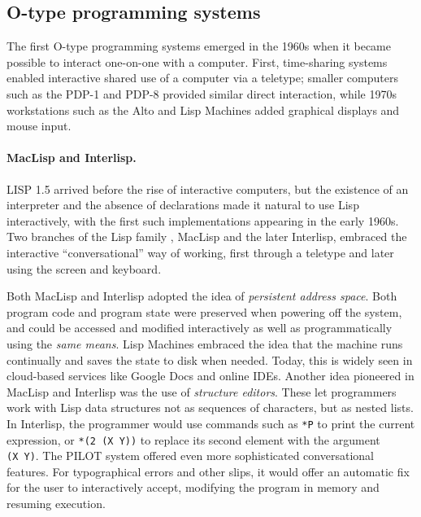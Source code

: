 \hypertarget{o-type-programming-systems}{%
\subsection{O-type programming
systems}\label{o-type-programming-systems}}

The first O-type programming systems emerged in the 1960s when it became
possible to interact one-on-one with a computer. First, time-sharing
systems enabled interactive shared use of a computer via a teletype;
smaller computers such as the PDP-1 and PDP-8 provided similar direct
interaction, while 1970s workstations such as the Alto and Lisp Machines
added graphical displays and mouse input.

\paragraph{MacLisp and Interlisp.}

LISP 1.5 \cite{LISP15} arrived before the rise of interactive computers,
but the existence of an interpreter and the absence of declarations made
it natural to use Lisp interactively, with the first such
implementations appearing in the early 1960s. Two branches of the Lisp
family \cite{LispEvolve}, MacLisp and the later Interlisp, embraced the
interactive ``conversational'' way of working, first through a teletype
and later using the screen and keyboard.

Both MacLisp and Interlisp adopted the idea of \emph{persistent address
space}. Both program code and program state were preserved when powering
off the system, and could be accessed and modified interactively as well
as programmatically using the \emph{same means}. Lisp Machines embraced
the idea that the machine runs continually and saves the state to disk
when needed. Today, this is widely seen in cloud-based services like
Google Docs and online IDEs. Another idea pioneered in MacLisp and
Interlisp was the use of \emph{structure editors}. These let programmers
work with Lisp data structures not as sequences of characters, but as
nested lists. In Interlisp, the programmer would use commands such as
\texttt{*P} to print the current expression, or \texttt{*(2\ (X\ Y))} to
replace its second element with the argument \texttt{(X\ Y)}. The PILOT
system \cite{Pilot} offered even more sophisticated conversational
features. For typographical errors and other slips, it would offer an
automatic fix for the user to interactively accept, modifying the
program in memory and resuming execution.

